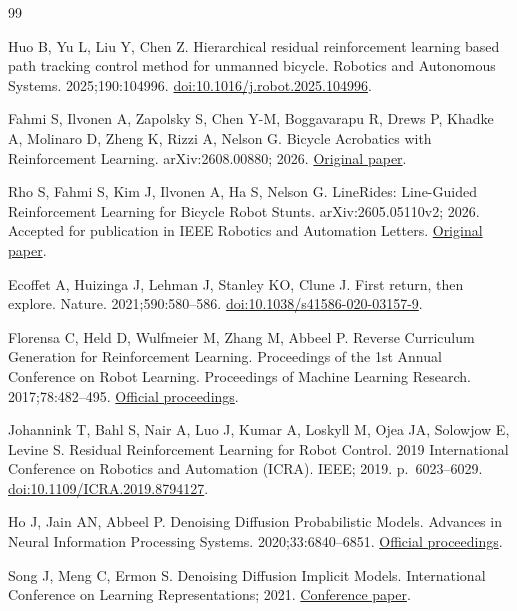 \documentclass[
  american,
  11pt,
  a4paper,
]{article}
\begin{document}
\begin{thebibliography}{99}

Huo B, Yu L, Liu Y, Chen Z. Hierarchical residual reinforcement
learning based path tracking control method for unmanned bicycle.
Robotics and Autonomous Systems. 2025;190:104996.
\href{https://doi.org/10.1016/j.robot.2025.104996}{doi:10.1016/j.robot.2025.104996}.

Fahmi S, Ilvonen A, Zapolsky S, Chen Y-M, Boggavarapu R, Drews
P, Khadke A, Molinaro D, Zheng K, Rizzi A, Nelson G. Bicycle Acrobatics
with Reinforcement Learning. arXiv:2608.00880; 2026.
\href{https://arxiv.org/abs/2608.00880}{Original paper}.

Rho S, Fahmi S, Kim J, Ilvonen A, Ha S, Nelson G. LineRides:
Line-Guided Reinforcement Learning for Bicycle Robot Stunts.
arXiv:2605.05110v2; 2026. Accepted for publication in IEEE Robotics and
Automation Letters. \href{https://arxiv.org/abs/2605.05110v2}{Original
paper}.

Ecoffet A, Huizinga J, Lehman J, Stanley KO, Clune J. First
return, then explore. Nature. 2021;590:580--586.
\href{https://doi.org/10.1038/s41586-020-03157-9}{doi:10.1038/s41586-020-03157-9}.

Florensa C, Held D, Wulfmeier M, Zhang M, Abbeel P. Reverse
Curriculum Generation for Reinforcement Learning. Proceedings of the 1st
Annual Conference on Robot Learning. Proceedings of Machine Learning
Research. 2017;78:482--495.
\href{https://proceedings.mlr.press/v78/florensa17a.html}{Official
proceedings}.

Johannink T, Bahl S, Nair A, Luo J, Kumar A, Loskyll M, Ojea JA,
Solowjow E, Levine S. Residual Reinforcement Learning for Robot Control.
2019 International Conference on Robotics and Automation (ICRA). IEEE;
2019. p.~6023--6029.
\href{https://doi.org/10.1109/ICRA.2019.8794127}{doi:10.1109/ICRA.2019.8794127}.

Ho J, Jain AN, Abbeel P. Denoising Diffusion Probabilistic
Models. Advances in Neural Information Processing Systems.
2020;33:6840--6851.
\href{https://proceedings.neurips.cc/paper/2020/hash/4c5bcfec8584af0d967f1ab10179ca4b-Abstract.html}{Official
proceedings}.

Song J, Meng C, Ermon S. Denoising Diffusion Implicit Models.
International Conference on Learning Representations; 2021.
\href{https://openreview.net/forum?id=St1giarCHLP}{Conference paper}.


\end{thebibliography}
\end{document}
